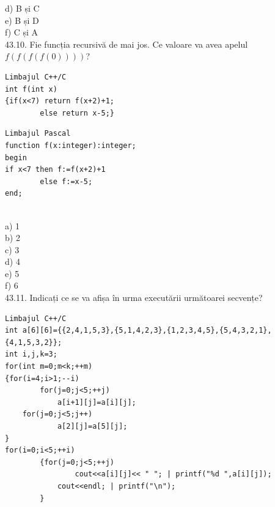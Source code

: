 \begin{itemize}
\begin{enumerate}
d) B și C
\\
e) B și D
\\
f) C și A
\\
43.10. Fie funcția recursivă de mai jos. Ce valoare va avea apelul $f(f(f(f(0))))$?
\begin{verbatim}
Limbajul C++/C
int f(int x)
{if(x<7) return f(x+2)+1;
        else return x-5;}
\end{verbatim}
\begin{verbatim}
Limbajul Pascal
function f(x:integer):integer;
begin
if x<7 then f:=f(x+2)+1
        else f:=x-5;
end;
\end{verbatim}
\\
a) 1
\\
b) 2
\\
c) 3
\\
d) 4
\\
e) 5
\\
f) 6
\\
43.11. Indicați ce se va afișa în urma executării următoarei secvențe?
\begin{verbatim}
Limbajul C++/C
int a[6][6]={{2,4,1,5,3},{5,1,4,2,3},{1,2,3,4,5},{5,4,3,2,1},{4,1,5,3,2}};
int i,j,k=3;
for(int m=0;m<k;++m)
{for(i=4;i>1;--i)
        for(j=0;j<5;++j)
            a[i+1][j]=a[i][j];
    for(j=0;j<5;j++)
            a[2][j]=a[5][j];
}
for(i=0;i<5;++i)
        {for(j=0;j<5;++j)
                cout<<a[i][j]<< " "; | printf("%d ",a[i][j]);
            cout<<endl; | printf("\n");
        }


\end{verbatim}
\end{enumerate}
\end{itemize}
